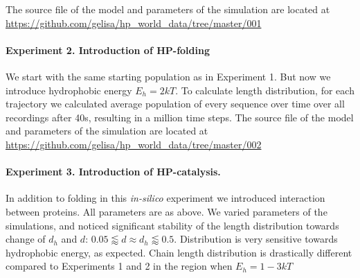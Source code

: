 \documentclass[journal=jacsat,manuscript=article,layout=twocolumn]{achemso}
\begin{document}
The source file of the model and parameters of the simulation are located at 
\url{https://github.com/gelisa/hp_world_data/tree/master/001}

\paragraph{Experiment 2. Introduction of HP-folding}
We start with the same starting population as in Experiment 1. But now we introduce hydrophobic 
energy $E_h= 2kT$. To calculate length distribution, 
for each trajectory we calculated average population of every sequence over time over all 
recordings 
after 40s, resulting in a million time steps. The source file of the model and parameters of the 
simulation are located at \url{https://github.com/gelisa/hp_world_data/tree/master/002}


\paragraph{Experiment 3. Introduction of HP-catalysis.}
In addition to folding in this \textit{in-silico} experiment we introduced interaction between 
proteins. All parameters are as above. We varied parameters of the simulations, and noticed 
significant stability of the length distribution towards change of $d_h$ and $d$: $0.05\lessapprox 
d\approx d_h \lessapprox 0.5$. Distribution is very sensitive towards hydrophobic energy, as 
expected. Chain length distribution is drastically different compared to Experiments 1 and 2 in the 
region when $E_h= 1-3 kT$



 \newpage



 

\end{document}
